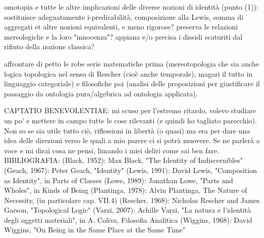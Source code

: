 \documentclass{amsart}
\begin{document}
omotopia e tutte le altre implicazioni delle diverse nozioni di identità (punto (1)): sostituisce adeguatamente i-predicabilità, composizione alla Lewis, somma di aggregati et altre nozioni equivalenti, e meno rigorose? preserva le relazioni mereologiche e la loro "innocenza"? appiana e/o precisa i dissidi scaturiti dal rifiuto della nozione classica?

affrontare di petto le robe serie matematiche prima (mereotopologia che sia anche logica topologica nel senso di Rescher (cioè anche temporale), magari il tutto in linguaggio categoriale) e filosofiche poi (analisi delle proposizioni per giustificare il passaggio da ontologia pura/algebrica ad ontologia applicata). 

CAPTATIO BENEVOLENTIAE: 
mi scuso per l'estremo ritardo, volevo studiare un po' e mettere in campo tutte le cose rilevanti (e quindi ho tagliato parecchio). Non so se sia utile tutto ciò, riflessioni in libertà (o quasi) ma era per dare una idea delle direzioni verso le quali a mio parere ci si potrà muovere. Se ne parlerà a voce e mi dirai cosa ne pensi, limando i miei deliri come sai ben fare.  
BIBLIOGRAFIA:
(Black, 1952): Max Black, "The Identity of Indiscernibles"
(Geach, 1967): Peter Geach, "Identity"
(Lewis, 1991): David Lewis, "Composition as Identity", in Parts of Classes
(Lowe, 1989): Jonathan Lowe, "Parts and Wholes", in Kinds of Being
(Plantinga, 1978): Alvin Plantinga, The Nature of Necessity, (in particolare cap. VII.4)
(Rescher, 1968): Nicholas Rescher and James Garson, "Topological Logic"
(Varzi, 2007): Achille Varzi, "La natura e l'identità degli oggetti materiali", in A. Coliva, Filosofia Analitica
(Wiggins, 1968): David Wiggins, "On Being in the Same Place at the Same Time"
\end{document}
